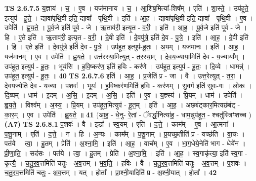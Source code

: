 \documentclass[17pt]{extarticle}
\begin{document}
                                \textbf{ TS 2.6.7.5} \newline
                  य॒ज्ञाय॑ । च॒ । ए॒व । यज॑मानाय । च॒ । आ॒शिष॒मित्या᳚-शिष᳚म् । एति॑ । शा॒स्ते॒ । उप॑हूते॒ इत्युप॑ - हू॒ते॒ । द्यावा॑पृथि॒वी इति॒ द्यावा᳚ - पृ॒थि॒वी । इति॑ । आ॒ह॒ । द्यावा॑पृथि॒वी इति॒ द्यावा᳚ - पृ॒थि॒वी । ए॒व । उपेति॑ । ह्व॒य॒ते॒ । पू॒र्व॒जे इति॑ पूर्व - जे । ऋ॒ताव॑री॒ इत्यृ॒त - व॒री॒ । इति॑ । आ॒ह॒ । पू॒र्व॒जे इति॑ पूर्व - जे । हि । ए॒ते इति॑ । ऋ॒ताव॑री॒ इत्यृ॒त - व॒री॒ । दे॒वी इति॑ । दे॒वपु॑त्रे॒ इति॑ दे॒व - पु॒त्रे॒ । इति॑ । आ॒ह॒ । दे॒वी इति॑ । हि । ए॒ते इति॑ । दे॒वपु॑त्रे॒ इति॑ दे॒व - पु॒त्रे॒ । उप॑हूत॒ इत्युप॑-हू॒तः॒ । अ॒यम् । यज॑मानः । इति॑ । आ॒ह॒ । यज॑मानम् । ए॒व । उपेति॑ । ह्व॒य॒ते॒ । उत्त॑रस्या॒मित्युत् - त॒र॒स्या॒म् । दे॒व॒य॒ज्याया॒मिति॑ देव - य॒ज्याया᳚म् । उप॑हूत॒ इत्युप॑ - हू॒तः॒ । भूय॑सि । ह॒वि॒ष्कर॑ण॒ इति॑ हविः - कर॑णे । उप॑हूत॒ इत्युप॑ - हू॒तः॒ । दि॒व्ये । धामन्न्॑ । उप॑हूत॒ इत्युप॑ - हू॒तः॒ । \textbf{  40} \newline
                  \newline
                                \textbf{ TS 2.6.7.6} \newline
                  इति॑ । आ॒ह॒ । प्र॒जेति॑ प्र - जा । वै । उत्त॒रेत्युत् - त॒रा॒ । दे॒व॒य॒ज्येति॑ देव - य॒ज्या । प॒शवः॑ । भूयः॑ । ह॒वि॒ष्कर॑ण॒मिति॑ हविः - कर॑णम् । सु॒व॒र्ग इति॑ सुवः-गः । लो॒कः । दि॒व्यम् । धाम॑ । इ॒दम् । अ॒सि॒ । इ॒दम् । अ॒सि॒ । इति॑ । ए॒व । य॒ज्ञ्स्य॑ । प्रि॒यम् । धाम॑ । उपेति॑ । ह्व॒य॒ते॒ । विश्व᳚म् । अ॒स्य॒ । प्रि॒यम् । उप॑हूत॒मित्युप॑ - हू॒त॒म् । इति॑ । आ॒ह॒ । अछ॑बंट्कार॒मित्यछ॑बंट् - का॒र॒म् । ए॒व । उपेति॑ । ह्व॒य॒ते॒ ॥ \textbf{  41} \newline
                  \newline
                      (आ॒ह॒ - धे॒नु- रे॒तां - ॅवर्द्धा॒नित्या॑ह॒ - धाम॒न्नुप॑हूत॒ - श्चतु॑स्त्रिꣳशच्च )  \textbf{(A7)} \newline \newline
                                \textbf{ TS 2.6.8.1} \newline
                  प॒शवः॑ । वै । इडा᳚ । स्व॒यम् । एति॑ । द॒त्ते॒ । काम᳚म् । ए॒व । आ॒त्मना᳚ । प॒शू॒नाम् । एति॑ । द॒त्ते॒ । न । हि । अ॒न्यः । काम᳚म् । प॒शू॒नाम् । प्र॒यच्छ॒तीति॑ प्र - यच्छ॑ति । वा॒चः । पत॑ये । त्वा॒ । हु॒तम् । प्रेति॑ । अ॒श्ना॒मि॒ । इति॑ । आ॒ह॒ । वाच᳚म् । ए॒व । भा॒ग॒धेये॒नेति॑ भाग - धेये॑न । प्री॒णा॒ति॒ । सद॑सः । पत॑ये । त्वा॒ । हु॒तम् । प्रेति॑ । अ॒श्ना॒मि॒ । इति॑ । आ॒ह॒ । स्व॒गाकृ॑त्या॒ इति॑ स्व॒गा - कृ॒त्यै॒ । च॒तु॒र॒व॒त्तमिति॑ चतुः - अ॒व॒त्तम् । भ॒व॒ति॒ । ह॒विः । वै । च॒तु॒र॒व॒त्तमिति॑ चतुः - अ॒व॒त्तम् । प॒शवः॑ । च॒तु॒र॒व॒त्तमिति॑ चतुः - अ॒व॒त्तम् । यत् । होता᳚ । प्रा॒श्नी॒यादिति॑ प्र - अ॒श्नी॒यात् । होता᳚ । \textbf{  42} \newline
\end{document}
